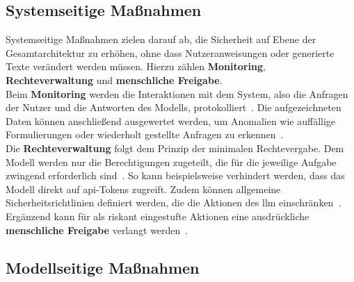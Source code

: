 \subsection{Systemseitige Maßnahmen}

Systemseitige Maßnahmen zielen darauf ab, die Sicherheit auf Ebene der Gesamtarchitektur zu erhöhen, ohne dass Nutzeranweisungen oder generierte Texte verändert werden
müssen. Hierzu zählen \textbf{Monitoring}, \textbf{Rechteverwaltung} und \textbf{menschliche Freigabe}. \\
Beim \textbf{Monitoring} werden die Interaktionen mit dem System, also die Anfragen der Nutzer und die Antworten des Modells, protokolliert~\cite{sm04}. Die aufgezeichneten
Daten können anschließend ausgewertet werden, um Anomalien wie auffällige Formulierungen oder wiederholt gestellte Anfragen zu erkennen~\cite[12]{sm10}. \\
Die \textbf{Rechteverwaltung} folgt dem Prinzip der minimalen Rechtevergabe. Dem Modell werden nur die Berechtigungen zugeteilt, die für die jeweilige Aufgabe zwingend
erforderlich sind~\cite{pi15}. So kann beispielsweise verhindert werden, dass das Modell direkt auf \ac{api}-Tokens zugreift. Zudem können allgemeine Sicherheitsrichtlinien
definiert werden, die die Aktionen des \ac{llm} einschränken~\cite[8]{sm09}. Ergänzend kann für als riskant eingestufte Aktionen eine ausdrückliche 
\textbf{menschliche Freigabe} verlangt werden~\cite{pi15}.

\subsection{Modellseitige Maßnahmen}


